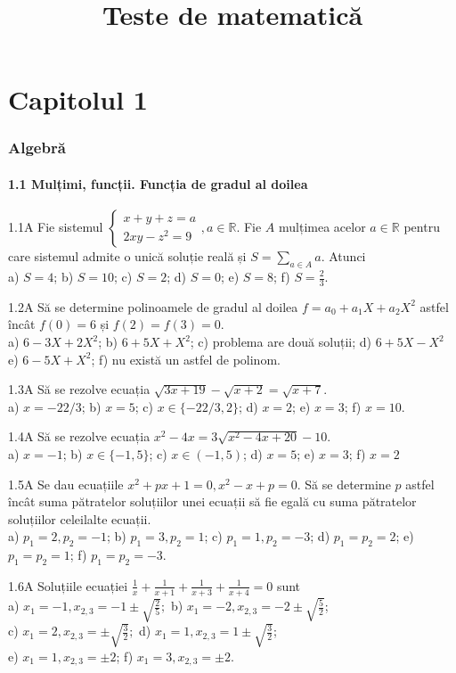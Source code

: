 \documentclass[11pt]{article}
\title{Teste de matematică}
\author{}
\date{}
\begin{document}
\maketitle

\part*{Capitolul 1}
\section*{Algebră}
\subsection*{1.1 Mulțimi, funcții. Funcția de gradul al doilea}
1.1A Fie sistemul $\left\{\begin{array}{l}x+y+z=a \\ 2 x y-z^{2}=9\end{array}, a \in \mathbb{R}\right.$. Fie $A$ mulțimea acelor $a \in \mathbb{R}$ pentru care sistemul admite o unică soluție reală și $S=\sum_{a \in A} a$. Atunci\\ a) $S=4$; b) $S=10$; c) $S=2$; d) $S=0$; e) $S=8$; f) $S=\frac{2}{3}$.

1.2A Să se determine polinoamele de gradul al doilea $f=a_{0}+a_{1} X+a_{2} X^{2}$ astfel încât $f(0)=6$ și $f(2)=f(3)=0$.\\ a) $6-3 X+2 X^{2}$; b) $6+5 X+X^{2}$; c) problema are două soluții; d) $6+5 X-X^{2}$\\ e) $6-5 X+X^{2}$; f) nu există un astfel de polinom.

1.3A Să se rezolve ecuația $\sqrt{3 x+19}-\sqrt{x+2}=\sqrt{x+7}$.\\ a) $x=-22 / 3$; b) $x=5$; c) $x \in\{-22 / 3,2\}$; d) $x=2$; e) $x=3$; f) $x=10$.

1.4A Să se rezolve ecuația $x^{2}-4 x=3 \sqrt{x^{2}-4 x+20}-10$.\\ a) $x=-1$; b) $x \in\{-1,5\}$; c) $x \in(-1,5)$; d) $x=5$; e) $x=3$; f) $x=2$

1.5A Se dau ecuațiile $x^{2}+px+1=0, x^{2}-x+p=0$. Să se determine $p$ astfel încât suma pătratelor soluțiilor unei ecuații să fie egală cu suma pătratelor soluțiilor celeilalte ecuații.\\ a) $p_{1}=2, p_{2}=-1$; b) $p_{1}=3, p_{2}=1$; c) $p_{1}=1, p_{2}=-3$; d) $p_{1}=p_{2}=2$; e) $p_{1}=p_{2}=1$; f) $p_{1}=p_{2}=-3$.

1.6A Soluțiile ecuației $\frac{1}{x}+\frac{1}{x+1}+\frac{1}{x+3}+\frac{1}{x+4}=0$ sunt\\ a) $x_{1}=-1, x_{2,3}=-1 \pm \sqrt{\frac{2}{5}} ;$ b) $x_{1}=-2, x_{2,3}=-2 \pm \sqrt{\frac{5}{2}}$;\\ c) $x_{1}=2, x_{2,3}= \pm \sqrt{\frac{3}{2}} ;$ d) $x_{1}=1, x_{2,3}=1 \pm \sqrt{\frac{3}{2}}$;\\ e) $x_{1}=1, x_{2,3}= \pm 2$; f) $x_{1}=3, x_{2,3}= \pm 2$.
\end{document}
